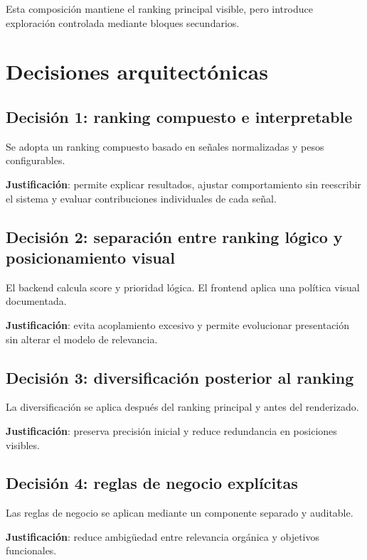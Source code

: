 \documentclass[12pt,a4paper]{article}
\begin{document}
Esta composición mantiene el ranking principal visible, pero introduce exploración controlada mediante bloques secundarios.

\section{Decisiones arquitectónicas}

\subsection{Decisión 1: ranking compuesto e interpretable}

Se adopta un ranking compuesto basado en señales normalizadas y pesos configurables.

\textbf{Justificación}: permite explicar resultados, ajustar comportamiento sin reescribir el sistema y evaluar contribuciones individuales de cada señal.

\subsection{Decisión 2: separación entre ranking lógico y posicionamiento visual}

El backend calcula score y prioridad lógica. El frontend aplica una política visual documentada.

\textbf{Justificación}: evita acoplamiento excesivo y permite evolucionar presentación sin alterar el modelo de relevancia.

\subsection{Decisión 3: diversificación posterior al ranking}

La diversificación se aplica después del ranking principal y antes del renderizado.

\textbf{Justificación}: preserva precisión inicial y reduce redundancia en posiciones visibles.

\subsection{Decisión 4: reglas de negocio explícitas}

Las reglas de negocio se aplican mediante un componente separado y auditable.

\textbf{Justificación}: reduce ambigüedad entre relevancia orgánica y objetivos funcionales.
\end{document}

